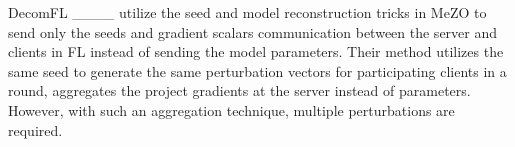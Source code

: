  DecomFL ____ utilize the seed and model reconstruction tricks in MeZO to send only the seeds and gradient scalars communication between the server and clients in \ac{FL} instead of sending the model parameters. Their method utilizes the same seed to generate the same perturbation vectors for participating clients in a round, aggregates the project gradients at the server instead of parameters. However, with such an aggregation technique, multiple perturbations are required.